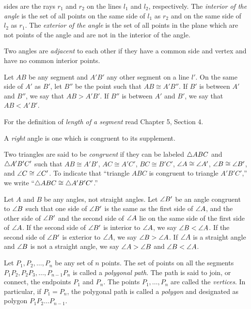 \documentclass[11pt]{book}
\begin{document}
\begin{applist}
      sides are the rays $r_1$ and $r_2$ on the lines $l_1$ and $l_2$,
      respectively. The \emph{interior of the angle} is the set of all
      points on the same side of $l_1$ as $r_2$ and on the same side of
      $l_2$ as $r_1$. The \emph{exterior of the angle} is the set of all
      points in the plane which are not points of the angle and are not in
      the interior of the angle.
\item Two angles are \emph{adjacent} to each other if they have a common
      side and vertex and have no common interior points.
\item Let $AB$ be any segment and $A'B'$ any other segment on a line $l'$.
      On the same side of $A'$ as $B'$, let $B''$ be the point such that
      $AB \cong A'B''$. If $B'$ is between $A'$ and $B''$, we say that
      $AB > A'B'$. If $B''$ is between $A'$ and $B'$, we say that
      $AB < A'B'$.
\item For the definition of \emph{length of a segment} read Chapter 5,
      Section 4.
\item A \emph{right} angle is one which is congruent to its supplement.
\item Two triangles are said to be \emph{congruent} if they can be labeled
      $\triangle ABC$ and $\triangle A'B'C'$ such that $AB \cong A'B'$,
      $AC \cong A'C'$, $BC \cong B'C'$, $\angle A \cong \angle A'$,
      $\angle B \cong \angle B'$, and $\angle C \cong \angle C'$. To indicate
      that ``triangle $ABC$ is congruent to triangle $A'B'C'$,'' we write
      ``$\triangle ABC \cong \triangle A'B'C'$.''
\item Let $A$ and $B$ be any angles, not straight angles. Let $\angle B'$ be
      an angle congruent to $\angle B$ such that one side of $\angle B'$ is
      the same as the first side of $\angle A$, and the other side of
      $\angle B'$ and the second side of $\angle A$ lie on the same side of
      the first side of $\angle A$. If the second side of $\angle B'$ is
      interior to $\angle A$, we say $\angle B < \angle A$. If the second side
      of $\angle B'$ is exterior to $\angle A$, we say $\angle B > \angle A$. If
      $\angle A$ is a straight angle and $\angle B$ is not a straight angle,
      we say $\angle A > \angle B$ and $\angle B < \angle A$.
\item Let $P_1, P_2, \ldots, P_n$ be any set of $n$ points. The set of
      points on all the segments $P_1P_2, P_2P_3, \ldots, P_{n-1}P_n$ is
      called a \emph{polygonal path}. The path is said to join, or connect,
      the endpoints $P_1$ and $P_n$. The points $P_1, \ldots, P_n$ are
      called the \emph{vertices}. In particular, if $P_1 = P_n$, the
      polygonal path is called a \emph{polygon} and designated as polygon
      $P_1P_2 \ldots P_{n-1}$.


\end{applist}
\end{document}
